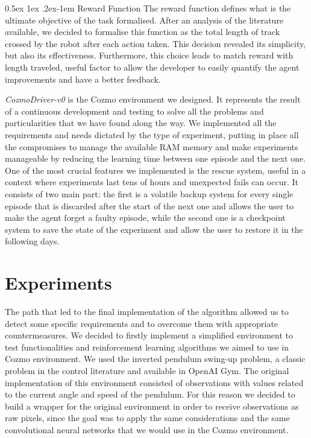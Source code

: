 \documentclass[10pt,twocolumn,letterpaper]{article}
\makeatletter
\renewcommand{\paragraph}{%
  \@startsection{paragraph}{4}%
  {\z@}{0.5ex \@plus 1ex \@minus .2ex}{-1em}%
  {\normalfont\normalsize\bfseries}%
}
\makeatother
\begin{document}
\paragraph{Reward Function} The reward function defines what is the ultimate objective of the task formalised. After an analysis of the literature available, we decided to formalise this function as the total length of track crossed by the robot after each action taken. This decision revealed its simplicity, but also its effectiveness. Furthermore, this choice leads to match reward with length traveled, useful factor to allow the developer to easily quantify the agent improvements and have a better feedback.

\textit{CozmoDriver-v0} is the Cozmo environment we designed. It represents the result of a continuous development and testing to solve all the problems and particularities that we have found along the way. We implemented all the requirements and needs dictated by the type of experiment, putting in place all the compromises to manage the available RAM memory and make experiments manageable by reducing the learning time between one episode and the next one.
One of the most crucial features we implemented is the rescue system, useful in a context where experiments last tens of hours and unexpected fails can occur.
It consists of two main part: the first is a volatile backup system for every single episode that is discarded after the start of the next one and allows the user to make the agent forget a faulty episode, while the second one is a checkpoint system to save the state of the experiment and allow the user to restore it in the following days.

\section{Experiments}

The path that led to the final implementation of the algorithm allowed us to detect some specific requirements and to overcome them with appropriate countermeasures.
We decided to firstly implement a simplified environment to test functionalities and reinforcement learning algorithms we aimed to use in Cozmo environment. We used the inverted pendulum swing-up problem, a classic problem in the control literature and available in OpenAI Gym. 
The original implementation of this environment consisted of observations with values related to the current angle and speed of the pendulum. For this reason we decided to build a wrapper for the original environment in order to receive observations as raw pixels, since the goal was to apply the same considerations and the same convolutional neural networks that we would use in the Cozmo environment.
\end{document}
